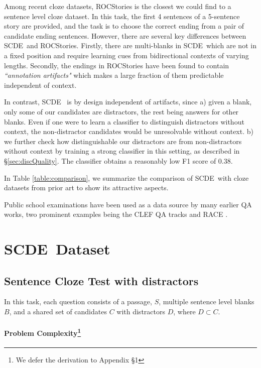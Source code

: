 \documentclass[11pt,a4paper]{article}
\newcommand{\dsname}{\textsc{SCDE}}
\begin{document}
Among recent cloze datasets, ROCStories \cite{mostafazadeh2017lsdsem} is the closest we could find to a sentence level cloze dataset. In this task, the first 4 sentences of a 5-sentence story are provided, and the task is to choose the correct ending from a pair of candidate ending sentences. However, there are several key differences between \dsname~and ROCStories. Firstly, there are multi-blanks in \dsname~which are not in a fixed position and require learning cues from bidirectional contexts of varying lengths. Secondly, the endings in ROCStories have been found to contain \emph{``annotation artifacts"} \cite{gururangan2018annotation} which makes a large fraction of them predictable independent of context. 

In contrast, \dsname~ is by design independent of artifacts, since
 a) given a blank, only some of our candidates are distractors, the rest being answers for other blanks. Even if one were to learn a classifier to distinguish distractors without context, the non-distractor candidates would be unresolvable without context. b) we further check how distinguishable our distractors are from non-distractors without context  by training a  strong classifier in this setting, as described in \S \ref{sec:discQuality}. The classifier obtains a reasonably low F1 score of $0.38$.

In Table \ref{table:comparison}, we summarize the comparison of \dsname~with cloze datasets from prior art to show its attractive aspects.

Public school examinations have been used as a data source by many earlier QA works, two prominent examples being the CLEF QA tracks \cite{penas2014overview,rodrigo2015overview} and RACE \cite{lai2017race}. 



\section{\dsname~Dataset}
\label{sec:senta}
\subsection{Sentence Cloze Test with distractors}
In this task, each question consists of a passage, $S$, multiple sentence level  blanks $B$,  and  a  shared  set  of  candidates $C$ with distractors $D$, where $D \subset C$.
\paragraph{Problem Complexity\footnote{We defer the derivation to Appendix \S 1}} 
\end{document}

